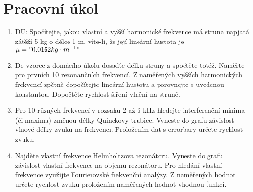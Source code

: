 \section{Pracovní úkol}

\begin{enumerate}
\item DU: Spočítejte, jakou vlastní a vyšší harmonické frekvence má struna napjatá
zátěží 5 kg o délce 1 m, víte-li, že její lineární hustota je $\mu="0.0162 kg\cdot m^{-1}"$
\item Do vzorce z domácího úkolu dosadťe délku struny a spočtěte totéž. Naměřte pro prvních 10
rezonančních frekvencí. Z naměřených vyšších harmonických frekvencí zpětně dopočítejte
lineární hustotu a porovnejte s uvedenou konstantou. Dopočtěte rychlost šíření vlnění na
struně.
\item Pro 10 různých frekvencí v rozsahu 2 až 6 kHz hledejte interferenční minima (či maxima)
změnou délky Quinckovy trubice. Vyneste do grafu závislost vlnové délky zvuku na frekvenci.
Proložením dat s errorbary určete rychlost zvuku.
\item Najděte vlastní frekvence Helmholtzova rezonátoru. Vyneste do grafu závislost vlastní frekvence
na objemu rezonátoru. Pro hledání vlastní frekvence využijte Fourierovské frekvenční
analýzy. Z naměřených hodnot určete rychlost zvuku proložením naměřených hodnot vhodnou
funkcí.
\end{enumerate}

